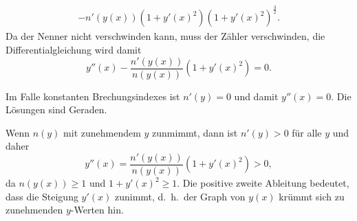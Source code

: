 \begin{loesung}
\begin{teilaufgaben}
\begin{align*}
{-
n'(y(x))
(1+y'(x)^2)
}{
(1+y'(x)^2)^{\frac32}
}.
\end{align*}
Da der Nenner nicht verschwinden kann, muss der Zähler verschwinden,
die Differentialgleichung wird damit
\[
y''(x)
-
\frac{n'(y(x))}{n(y(x))} (1 + y'(x)^2)
=
0.
\]
\item
Im Falle konstanten Brechungsindexes ist $n'(y)=0$ und damit $y''(x)=0$.
Die Lösungen sind Geraden.
\item
Wenn $n(y)$ mit zunehmendem $y$ zunmimmt, dann ist $n'(y)>0$ für alle $y$
und daher
\[
y''(x)
=
\frac{n'(y(x))}{n(y(x))} (1 + y'(x)^2)
>
0,
\]
da $n(y(x))\ge 1$ und $1+y'(x)^2\ge 1$.
Die positive zweite Ableitung bedeutet, dass die Steigung $y'(x)$ zunimmt,
d.~h.~der Graph von $y(x)$ krümmt sich zu zunehmenden $y$-Werten hin.
\qedhere
\end{teilaufgaben}
\end{loesung}


